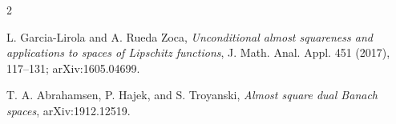 \documentclass[11pt]{amsart}
\begin{document}
\begin{thebibliography}{2}

L. Garcia-Lirola and A. Rueda Zoca,
\emph{Unconditional almost squareness and applications to spaces of Lipschitz
functions},
J. Math. Anal. Appl. 451 (2017), 117--131; arXiv:1605.04699.

T. A. Abrahamsen, P. Hajek, and S. Troyanski,
\emph{Almost square dual Banach spaces},
arXiv:1912.12519.

\end{thebibliography}
\end{document}
